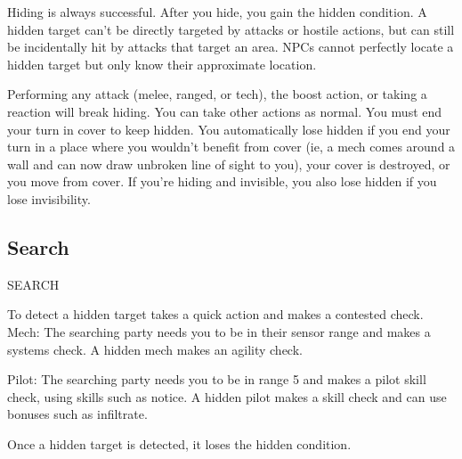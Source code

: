 Hiding is always successful. After you hide, you gain the hidden condition. A hidden target can’t  
be directly targeted by attacks or hostile actions, but can still be incidentally hit by attacks that  
target an area. NPCs cannot perfectly locate a hidden target but only know their approximate  
location. 
 

Performing any attack (melee, ranged, or tech), the boost action, or taking a reaction will break  
hiding. You can take other actions as normal. You must end your turn in cover to keep hidden.  
You automatically lose hidden if you end your turn in a place where you wouldn’t benefit from  
cover (ie, a mech comes around a wall and can now draw unbroken line of sight to you), your  
cover is destroyed, or you move from cover. If you’re hiding and invisible, you also lose hidden if  
you lose invisibility.
 
\subsection{Search}
                                                   SEARCH  

To detect a hidden target takes a quick action and makes a contested check.  
         Mech: The searching party needs you to be in their sensor range and makes a systems  
         check. A hidden mech makes an agility check.
 
         Pilot: The searching party needs you to be in range 5 and makes a pilot skill check, using  
         skills such as notice. A hidden pilot makes a skill check and can use bonuses such as  
         infiltrate.
 
Once a hidden target is detected, it loses the hidden condition.
 